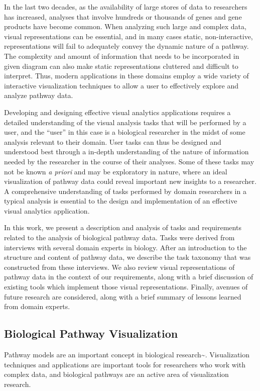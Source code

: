 In the last two decades, as the availability of large stores of data to researchers has increased, analyses that involve hundreds or thousands of genes and gene products have become common.
When analyzing such large and complex data, visual representations can be essential, and in many cases static, non-interactive, representations will fail to adequately convey the dynamic nature of a pathway.
The complexity and amount of information that needs to be incorporated in given diagram can also make static representations cluttered and difficult to interpret.
Thus, modern applications in these domains employ a wide variety of interactive visualization techniques to allow a user to effectively explore and analyze pathway data.

Developing and designing effective visual analytics applications requires a detailed understanding of the visual analysis tasks that will be performed by a user, and the ``user'' in this case is a biological researcher in the midst of some analysis relevant to their domain.
User tasks can thus be designed and understood best through a in-depth understanding of the nature of information needed by the researcher in the course of their analyses.
Some of these tasks may not be known \emph{a priori} and may be exploratory in nature, where an ideal visualization of pathway data could reveal important new insights to a researcher.
A comprehensive understanding of tasks performed by domain researchers in a typical analysis is essential to the design and implementation of an effective visual analytics application.

In this work, we present a description and analysis of tasks and requirements related to the analysis of biological pathway data.
Tasks were derived from interviews with several domain experts in biology.
After an introduction to the structure and content of pathway data, we describe the task taxonomy that was constructed from these interviews.
We also review visual representations of pathway data in the context of our requirements, along with a brief discussion of existing tools which implement those visual representations.
Finally, avenues of future research are considered, along with a brief summary of lessons learned from domain experts.

\subsection*{Biological Pathway Visualization}

Pathway models are an important concept in biological research\textasciitilde{}\cite{cairns2011regulation, luo2003targeting, reya2001stem}.
Visualization techniques and applications are important tools for researchers who work with complex data, and biological pathways are an active area of visualization research.

